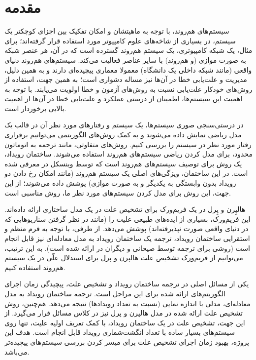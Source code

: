 \section{مقدمه}
سیستم‌های هم‌روند، با توجه به ماهیتشان
و امکان تفکیک بین اجزای کوچکتر یک سیستم،
در بسیاری از شاخه‌های علوم کامپیوتر مورد
استفاده قرار گرفته‌اند؛ برای مثال، یک شبکه
کامپیوتری، یک سیستم هم‌روند گسترده است که
در آن، هر عنصر شبکه به صورت موازی
(و هم‌روند)
با سایر عناصر فعالیت می‌کند. سیستم‌های
هم‌روند دنیای واقعی
(مانند شبکه داخلی یک دانشگاه)
معمولا معماری پیچیده‌ای دارند
و به همین دلیل، مدیریت و علت‌یابی خطا در
آن‌ها نیز مساله دشواری است؛ به همین جهت،
استفاده از روش‌های خودکار علت‌یابی نسبت
به روش‌های آزمون و خطا اولویت می‌یابند.
با توجه به اهمیت این سیستم‌ها، اطمینان از
درستی عملکرد و علت‌یابی خطا در آن‌ها از
اهمیت بالایی برخوردار است.


در درستی‌سنجی صوری سیستم‌ها، یک سیستم و
رفتارهای مورد نظر آن در قالب یک مدل ریاضی
نمایش داده می‌شوند و به کمک روش‌های
الگوریتمی می‌توانیم برقراری رفتار مورد نظر
در سیستم را بررسی کنیم. روش‌های متفاوتی،
مانند ترجمه به اتوماتون محدود، برای مدل
کردن ریاضی سیستم‌های هم‌روند استفاده
می‌شوند. ساختمان رویداد، یک روش برای توصیف
سیستم‌های هم‌روند است که توسط وینسکل در
\cite{winskel1987event,winskel1989introduction}
معرفی شده است. در این ساختمان،
ویژگی‌های اصلی یک سیستم هم‌روند 
(مانند امکان رخ دادن دو رویداد بدون وابستگی به یکدیگر و به صورت موازی)
پوشش داده می‌شوند؛ از این جهت، این روش
برای مدل کردن سیستم‌های مورد نظر ما، روش
مناسبی است.

هالپِرن و پِرل ‌در
\cite{halpern2001causes}
یک فریم‌ورک برای تشخیص علت‌
در یک مدل ساختاری
ارائه داده‌اند.
این فریم‌ورک، بسیاری از ایده‌های طبیعی علیت را
(مانند در نظر گرفتن سناریوهایی که در دنیای واقعی صورت نپذیرفته‌اند)
پوشش می‌دهد. از طرفی، با توجه به فرم منظم و
استقرایی ساختمان رویداد، ترجمه یک ساختمان رویداد
به مدل معادله‌ای نیز قابل انجام است
(روشی برای ترجمه توسط صیحانی و دیگران در
\cite{seyhani2022}
ارائه شده است).
به این ترتیب، می‌توانیم از فریم‌ورک تشخیص علت
هالپرن و پرل برای استدلال علّی در
یک سیستم هم‌روند استفاده کنیم.

یکی از مسائل اصلی در ترجمه ساختمان رویداد
و تشخیص علت‌، پیچیدگی زمان اجرای الگوریتم‌های
ارائه شده برای این مراحل است. ترجمه ساختمان رویداد
به مدل معادله‌ای، مدلی با اندازه نمایی 
(نسبت به تعداد رویدادها)
نتیجه می‌دهد. هم‌چنین، روش تشخیص علت ارائه شده
در مدل هالپرن و پرل نیز در کلاس مسائل
قرار می‌گیرد. از این جهت، تشخیص علت در
یک ساختمان رویداد، با کمک تعریف اولیه علیت،
تنها روی سیستم‌های بسیار ساده
با تعداد انگشت‌شماری رویداد قابل انجام است.
هدف این پروژه، بهبود زمان اجرای تشخیص علت
برای میسر کردن بررسی سیستم‌های پیچیده‌تر می‌باشد.

